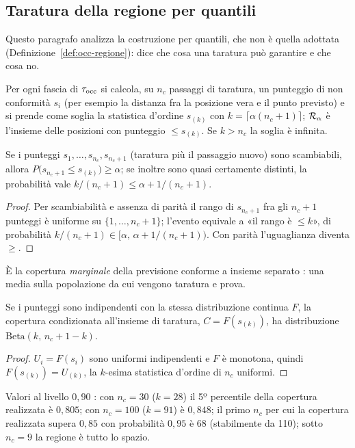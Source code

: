 \subsection{Taratura della regione per quantili}\label{sec:val-taratura}

Questo paragrafo analizza la costruzione per quantili, che non è quella adottata (Definizione~\ref{def:occ-regione}): dice che cosa una taratura può garantire e che cosa no.

Per ogni fascia di $\tau_{\mathrm{occ}}$ si calcola, su $n_c$ passaggi di taratura, un punteggio di non conformità $s_i$ (per esempio la distanza fra la posizione vera e il punto previsto) e si prende come soglia la statistica d'ordine $s_{(k)}$ con $k=\lceil\alpha(n_c+1)\rceil$; $\mathcal{R}_\alpha$ è l'insieme delle posizioni con punteggio $\le s_{(k)}$. Se $k>n_c$ la soglia è infinita.

\begin{proposizione}\label{prop:val-marginale}
Se i punteggi $s_1,\dots,s_{n_c},s_{n_c+1}$ (taratura più il passaggio nuovo) sono scambiabili, allora $P\bigl(s_{n_c+1}\le s_{(k)}\bigr)\ge\alpha$; se inoltre sono quasi certamente distinti, la probabilità vale $k/(n_c+1)\le\alpha+1/(n_c+1)$. 
\end{proposizione}
\begin{proof}
Per scambiabilità e assenza di parità il rango di $s_{n_c+1}$ fra gli $n_c+1$ punteggi è uniforme su $\{1,\dots,n_c+1\}$; l'evento equivale a «il rango è $\le k$», di probabilità $k/(n_c+1)\in[\alpha,\,\alpha+1/(n_c+1))$. Con parità l'uguaglianza diventa $\ge$.
\end{proof}
È la copertura \emph{marginale} della previsione conforme a insieme separato \cite{angelopoulos2021}: una media sulla popolazione da cui vengono taratura e prova.

\begin{proposizione}\label{prop:val-beta}
Se i punteggi sono indipendenti con la stessa distribuzione continua $F$, la copertura condizionata all'insieme di taratura, $C=F(s_{(k)})$, ha distribuzione $\mathrm{Beta}(k,\,n_c+1-k)$. 
\end{proposizione}
\begin{proof}
$U_i=F(s_i)$ sono uniformi indipendenti e $F$ è monotona, quindi $F(s_{(k)})=U_{(k)}$, la $k$-esima statistica d'ordine di $n_c$ uniformi.
\end{proof}
Valori al livello $0{,}90$ : con $n_c=30$ ($k=28$) il 5º percentile della copertura realizzata è $0{,}805$; con $n_c=100$ ($k=91$) è $0{,}848$; il primo $n_c$ per cui la copertura realizzata supera $0{,}85$ con probabilità $0{,}95$ è 68 (stabilmente da 110); sotto $n_c=9$ la regione è tutto lo spazio.

